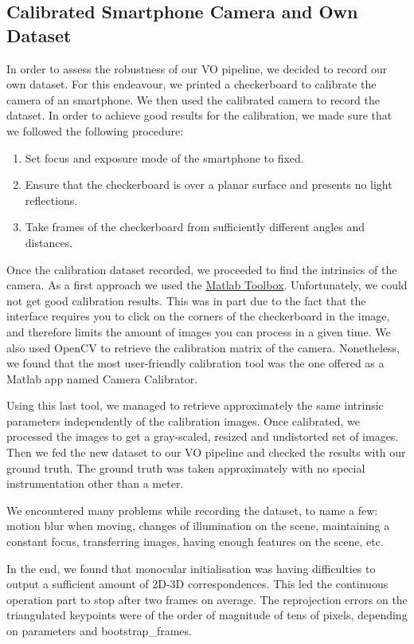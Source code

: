 \subsection{Calibrated Smartphone Camera and Own Dataset}

In order to assess the robustness of our VO pipeline, we decided to record our own dataset.
For this endeavour, we printed a checkerboard to calibrate the camera of an smartphone.
We then used the calibrated camera to record the dataset.
In order to achieve good results for the calibration, we made sure that we followed the following procedure:

\begin{enumerate}
	\item Set focus and exposure mode of the smartphone to fixed.
	\item Ensure that the checkerboard is over a planar surface and presents no light reflections.
	\item Take frames of the checkerboard from sufficiently different angles and distances.
\end{enumerate}

Once the calibration dataset recorded, we proceeded to find the intrinsics of the camera.
As a first approach we used the \href{https://www.vision.caltech.edu/bouguetj/calib_doc/}{Matlab Toolbox}.
Unfortunately, we could not get good calibration results.
This was in part due to the fact that the interface requires you to click on the
corners of the checkerboard in the image, and therefore limits the amount of images you can process in a given time.
We also used OpenCV to retrieve the calibration matrix of the camera. Nonetheless, we found that the most user-friendly
calibration tool was the one offered as a Matlab app named Camera Calibrator.

Using this last tool, we managed to retrieve approximately the same intrinsic parameters independently of the calibration images.
Once calibrated, we processed the images to get a gray-scaled, resized and undistorted set of images. Then we fed the new
dataset to our VO pipeline and checked the results with our ground truth.
The ground truth was taken approximately with no special instrumentation other than a meter.

We encountered many problems while recording the dataset, to name a few: motion blur when moving, changes of illumination on the scene,
maintaining a constant focus, transferring images, having enough features on the scene, etc.

In the end, we found that monocular initialisation was having difficulties to output a sufficient amount of 2D-3D correspondences.
This led the continuous operation part to stop after two frames on average. The reprojection errors on the triangulated keypoints were of
the order of magnitude of tens of pixels, depending on parameters and bootstrap\_frames.

